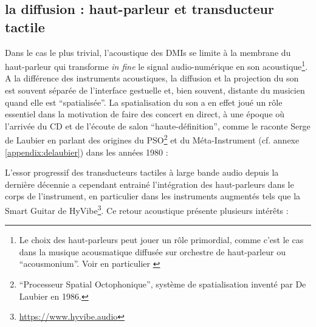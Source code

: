 \subsection{la diffusion : haut-parleur et transducteur tactile}

Dans le cas le plus trivial, l'acoustique des \glspl{DMI} se limite à la membrane du haut-parleur qui transforme \textit{in fine} le signal audio-numérique en son acoustique\footnote{Le choix des haut-parleurs peut jouer un rôle primordial, comme c'est le cas dans la musique acousmatique diffusée sur orchestre de haut-parleur ou ``acousmonium''. Voir en particulier \cite{mooney_sound_2006}}. A la différence des instruments acoustiques, la diffusion et la projection du son est souvent séparée de l'interface gestuelle et, bien souvent, distante du musicien quand elle est ``spatialisée''. La spatialisation du son a en effet joué un rôle essentiel dans la motivation de faire des concert en direct, à une époque où l'arrivée du \gls{CD} et de l'écoute de salon ``haute-définition'', comme le raconte Serge de Laubier en parlant des origines du PSO\footnote{``Processeur Spatial Octophonique'', système de spatialisation inventé par De Laubier en 1986.} et du Méta-Instrument (cf. annexe \ref{appendix:delaubier}) dans les années 1980 : 

L'essor progressif des transducteurs tactiles à large bande audio depuis la dernière décennie a cependant entrainé l'intégration des haut-parleurs dans le corps de l'instrument, en particulier dans les instruments augmentés tels que la Smart Guitar de HyVibe\footnote{\url{https://www.hyvibe.audio}}. Ce retour acoustique présente plusieurs intérêts :


